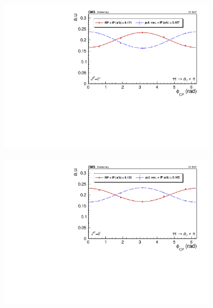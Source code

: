\begin{figure}[]
    \begin{subfigure}[b]{0.5\linewidth}
    \centering
    \includegraphics[width=\linewidth]{Chapitre6/Images/A1PION/A1PION_even_reco.pdf} 
    \caption*{} 
    \vspace{10mm}
  \end{subfigure}%
  \begin{subfigure}[b]{0.5\linewidth}
    \centering
    \includegraphics[width=\linewidth]{Chapitre6/Images/A1PION/A1PION_odd_reco.pdf} 
    \caption*{} 
    \vspace{10mm}
  \end{subfigure}


\end{figure}
